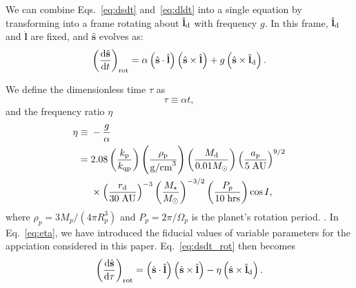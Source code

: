 \documentclass[
        fleqn,
        usenatbib,
    ]{mnras}
\newcommand*{\rd}[2]{\frac{\mathrm{d}#1}{\mathrm{d}#2}}
\newcommand*{\bm}[1]{\boldsymbol{\mathbf{#1}}}
\newcommand*{\uv}[1]{\hat{\bm{#1}}}
\newcommand*{\p}[1]{\left(#1\right)}
\begin{document}
We can combine Eqs.~\eqref{eq:dsdt} and~\eqref{eq:dldt} into a single equation
by transforming into a frame rotating about $\uv{l}_{\rm d}$ with frequency $g$.
In this frame, $\uv{l}_{\rm d}$ and $\uv{l}$ are fixed, and
$\uv{s}$ evolves as:
\begin{equation}
    \p{\rd{\uv{s}}{t}}_{\rm rot} = \alpha \p{\uv{s} \cdot \uv{l}}
            \p{\uv{s} \times \uv{l}}
        + g\p{\uv{s} \times \uv{l}_{\rm d}}.\label{eq:dsdt_rot}
\end{equation}

We define the dimensionless time $\tau$ as
\begin{equation}
    \tau \equiv \alpha t,
\end{equation}
and the frequency ratio $\eta$
\begin{align}
    \eta \equiv{}& -\frac{g}{\alpha}\nonumber\\
        ={}& 2.08 \p{\frac{k_{\rm p}}{k_{\rm qp}}}
            \p{\frac{\rho_{\rm p}}{\mathrm{g/cm}^3}}
            \p{\frac{M_{\rm d}}{0.01 M_{\odot}}}
            \p{\frac{a_{\rm p}}{5\;\mathrm{AU}}}^{9/2}\nonumber\\
        &\times
            \p{\frac{r_{\rm d}}{30 \;\mathrm{AU}}}^{-3}
            \p{\frac{M_\star}{M_{\odot}}}^{-3/2}
            \p{\frac{P_p}{10\;\mathrm{hrs}}}
            \cos I ,\label{eq:eta}
\end{align}
where $\rho_p = 3M_p/(4\pi R_p^3)$ and $P_p = 2\pi/\Omega_p$ is the planet's
rotation period. . In Eq.~\eqref{eq:eta}, we have introduced the fiducial values
of variable parameters for the appciation considered in this paper.
Eq.~\eqref{eq:dsdt_rot} then becomes
\begin{equation}
    \p{\rd{\uv{s}}{\tau}}_{\rm rot} = \p{\uv{s} \cdot \uv{l}}
            \p{\uv{s} \times \uv{l}}
        - \eta\p{\uv{s} \times \uv{l}_{\rm d}}. \label{eq:dsdt_base}
\end{equation}
\end{document}
